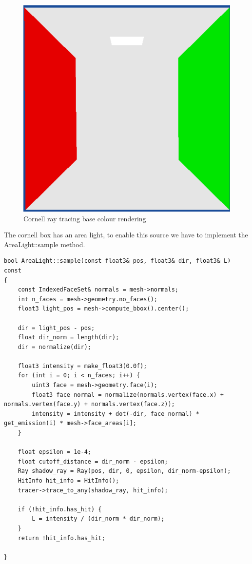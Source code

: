 \begin{figure}[H]
	\centering
	\includegraphics[scale=\imagescale]{images/worksheet_4/part_2}
	\caption{Cornell ray tracing base colour rendering}
	\label{fig:cornell_base_ray_tracing}
\end{figure}
The cornell box has an area light, to enable this source we have to implement the AreaLight::sample method.	
\begin{lstlisting}
bool AreaLight::sample(const float3& pos, float3& dir, float3& L) const
{
	const IndexedFaceSet& normals = mesh->normals;
	int n_faces = mesh->geometry.no_faces();
	float3 light_pos = mesh->compute_bbox().center();
	
	dir = light_pos - pos;
	float dir_norm = length(dir);
	dir = normalize(dir);
	
	float3 intensity = make_float3(0.0f);
	for (int i = 0; i < n_faces; i++) {
		uint3 face = mesh->geometry.face(i);
		float3 face_normal = normalize(normals.vertex(face.x) + normals.vertex(face.y) + normals.vertex(face.z));
		intensity = intensity + dot(-dir, face_normal) * get_emission(i) * mesh->face_areas[i];
	}
	
	float epsilon = 1e-4;
	float cutoff_distance = dir_norm - epsilon;
	Ray shadow_ray = Ray(pos, dir, 0, epsilon, dir_norm-epsilon);
	HitInfo hit_info = HitInfo();
	tracer->trace_to_any(shadow_ray, hit_info);
	
	if (!hit_info.has_hit) {
		L = intensity / (dir_norm * dir_norm);
	}
	return !hit_info.has_hit;
	
}
\end{lstlisting}

